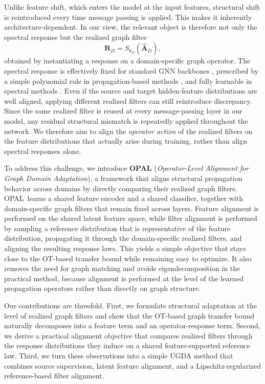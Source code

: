 \documentclass[runningheads]{llncs}
\newcommand{\model}{OPAL}
\def\mA{{\mathbf{A}}}
\def\mR{{\mathbf{R}}}
\begin{document}
Unlike feature shift, which enters the model at the input features, structural shift is reintroduced every time message passing is applied. This makes it inherently architecture-dependent. In our view, the relevant object is therefore not only the spectral response but the realized graph filter
\[
\mR_D = S_{\theta_D}(\widehat{\mA}_D),
\]
obtained by instantiating a response on a domain-specific graph operator. The spectral response is effectively fixed for standard GNN backbones \cite{gcn,dane,udagcn}, prescribed by a simple polynomial rule in propagation-based methods \cite{a2gnn}, and fully learnable in spectral methods \cite{dgsda}. Even if the source and target hidden-feature distributions are well aligned, applying different realized filters can still reintroduce discrepancy. Since the same realized filter is reused at every message-passing layer in our model, any residual structural mismatch is repeatedly applied throughout the network. We therefore aim to align the \emph{operator action} of the realized filters on the feature distributions that actually arise during training, rather than align spectral responses alone.

To address this challenge, we introduce \textbf{OPAL} (\emph{Operator-Level Alignment for Graph Domain Adaptation}), a framework that aligns structural propagation behavior across domains by directly comparing their realized graph filters. \model\ learns a shared feature encoder and a shared classifier, together with domain-specific graph filters that remain fixed across layers. Feature alignment is performed on the shared latent feature space, while filter alignment is performed by sampling a reference distribution that is representative of the feature distribution, propagating it through the domain-specific realized filters, and aligning the resulting response laws. This yields a simple objective that stays close to the OT-based transfer bound while remaining easy to optimize. It also removes the need for graph matching and avoids eigendecomposition in the practical method, because alignment is performed at the level of the learned propagation operators rather than directly on graph structure.

Our contributions are threefold. First, we formulate structural adaptation at the level of realized graph filters and show that the OT-based graph transfer bound naturally decomposes into a feature term and an operator-response term. Second, we derive a practical alignment objective that compares realized filters through the response distributions they induce on a shared feature-supported reference law. Third, we turn these observations into a simple UGDA method that combines source supervision, latent feature alignment, and a Lipschitz-regularized reference-based filter alignment.
\end{document}
